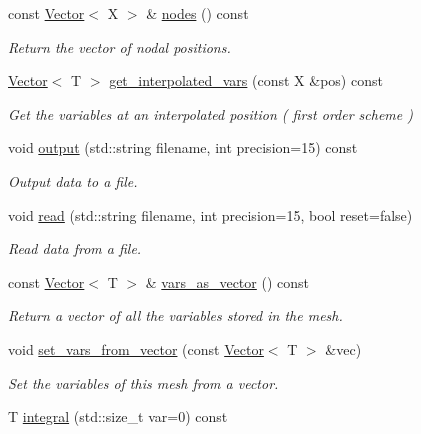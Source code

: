 \begin{DoxyCompactItemize}
const \hyperlink{classLuna_1_1Vector}{Vector}$<$ X $>$ \& \hyperlink{classLuna_1_1Mesh1D_a628f377e1a2d66a8ff53d052dcc697e2}{nodes} () const
\begin{DoxyCompactList}\small\item\em Return the vector of nodal positions. \end{DoxyCompactList}\item 
\hyperlink{classLuna_1_1Vector}{Vector}$<$ T $>$ \hyperlink{classLuna_1_1Mesh1D_af5e794667847fb278a028acc3ddea1d2}{get\+\_\+interpolated\+\_\+vars} (const X \&pos) const
\begin{DoxyCompactList}\small\item\em Get the variables at an interpolated position ( first order scheme ) \end{DoxyCompactList}\item 
void \hyperlink{classLuna_1_1Mesh1D_a4151177f59bac4391ca951af8c7e14e4}{output} (std\+::string filename, int precision=15) const
\begin{DoxyCompactList}\small\item\em Output data to a file. \end{DoxyCompactList}\item 
void \hyperlink{classLuna_1_1Mesh1D_ae8f5231c9745fbe70662dd6ce61ee418}{read} (std\+::string filename, int precision=15, bool reset=false)
\begin{DoxyCompactList}\small\item\em Read data from a file. \end{DoxyCompactList}\item 
const \hyperlink{classLuna_1_1Vector}{Vector}$<$ T $>$ \& \hyperlink{classLuna_1_1Mesh1D_a4e867f91a2d0cc0b44c14b97014207ce}{vars\+\_\+as\+\_\+vector} () const
\begin{DoxyCompactList}\small\item\em Return a vector of all the variables stored in the mesh. \end{DoxyCompactList}\item 
void \hyperlink{classLuna_1_1Mesh1D_ab5d22c6f03f81879e1b329f8dc87ec99}{set\+\_\+vars\+\_\+from\+\_\+vector} (const \hyperlink{classLuna_1_1Vector}{Vector}$<$ T $>$ \&vec)
\begin{DoxyCompactList}\small\item\em Set the variables of this mesh from a vector. \end{DoxyCompactList}\item 
T \hyperlink{classLuna_1_1Mesh1D_af317b96151dcd9aa9d31f4814740d3be}{integral} (std\+::size\+\_\+t var=0) const

\end{DoxyCompactItemize}
